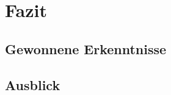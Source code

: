 \chapter{Fazit}\label{ch:fazit}
\section{Gewonnene Erkenntnisse}\label{sec:gewonnene-erkenntnisse}


\section{Ausblick}\label{sec:ausblick}
